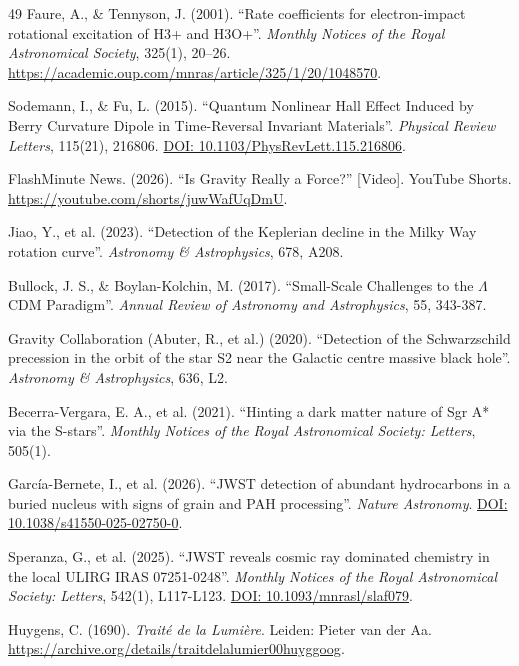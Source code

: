 \documentclass[11pt, a4paper]{article}
\newcommand{\doi}[1]{\href{https://doi.org/#1}{DOI: #1}}
\begin{document}
\begin{thebibliography}{49}
  Faure, A., \& Tennyson, J. (2001). ``Rate coefficients for electron-impact rotational excitation of H3+ and H3O+''. \textit{Monthly Notices of the Royal Astronomical Society}, 325(1), 20–26. 
  \url{https://academic.oup.com/mnras/article/325/1/20/1048570}.

  Sodemann, I., \& Fu, L. (2015). ``Quantum Nonlinear Hall Effect Induced by Berry Curvature Dipole in Time-Reversal Invariant Materials''. \textit{Physical Review Letters}, 115(21), 216806. 
  \doi{10.1103/PhysRevLett.115.216806}.

  FlashMinute News. (2026). ``Is Gravity Really a Force?'' [Video]. YouTube Shorts. \url{https://youtube.com/shorts/juwWafUqDmU}.

  Jiao, Y., et al. (2023). ``Detection of the Keplerian decline in the Milky Way rotation curve''. \textit{Astronomy \& Astrophysics}, 678, A208.

  Bullock, J. S., \& Boylan-Kolchin, M. (2017). ``Small-Scale Challenges to the $\Lambda$CDM Paradigm''. \textit{Annual Review of Astronomy and Astrophysics}, 55, 343-387.

  Gravity Collaboration (Abuter, R., et al.) (2020). ``Detection of the Schwarzschild precession in the orbit of the star S2 near the Galactic centre massive black hole''. \textit{Astronomy \& Astrophysics}, 636, L2.

  Becerra-Vergara, E. A., et al. (2021). ``Hinting a dark matter nature of Sgr A* via the S-stars''. \textit{Monthly Notices of the Royal Astronomical Society: Letters}, 505(1).

  García-Bernete, I., et al. (2026). ``JWST detection of abundant hydrocarbons in a buried nucleus with signs of grain and PAH processing''. \textit{Nature Astronomy}. 
  \doi{10.1038/s41550-025-02750-0}.

  Speranza, G., et al. (2025). ``JWST reveals cosmic ray dominated chemistry in the local ULIRG IRAS 07251-0248''. \textit{Monthly Notices of the Royal Astronomical Society: Letters}, 542(1), L117-L123.
  \doi{10.1093/mnrasl/slaf079}.

  Huygens, C. (1690). \textit{Traité de la Lumière}. Leiden: Pieter van der Aa.
  \url{https://archive.org/details/traitdelalumier00huyggoog}.


\end{thebibliography}
\end{document}
